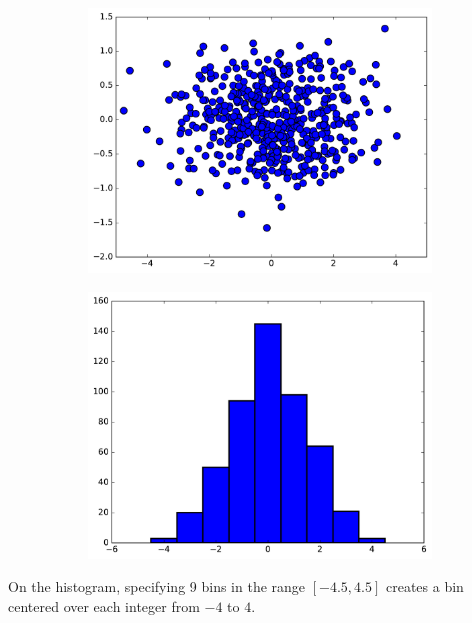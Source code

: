 \begin{figure}[H]
\captionsetup[subfigure]{justification=centering}
\centering
\begin{subfigure}{.49\textwidth}
    \centering
    \includegraphics[width=\linewidth]{figures/scatterplot.pdf}
\end{subfigure}
%
\begin{subfigure}{.49\textwidth}
    \centering
    \includegraphics[width=\linewidth]{figures/histogram.pdf}
\end{subfigure}
\end{figure}

On the histogram, specifying 9 bins in the range $[-4.5, 4.5]$ creates a bin centered over each integer from $-4$ to $4$.

